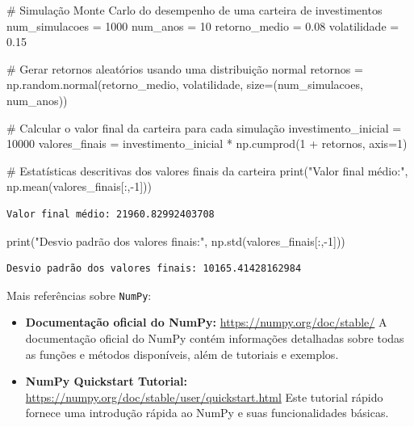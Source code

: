 \documentclass[
  portuguese,
  letterpaper,
  DIV=11,
  numbers=noendperiod]{scrreprt}
\newenvironment{Shaded}{\begin{snugshade}}{\end{snugshade}}
\newcommand{\BuiltInTok}[1]{\textcolor[rgb]{0.00,0.23,0.31}{#1}}
\newcommand{\CommentTok}[1]{\textcolor[rgb]{0.37,0.37,0.37}{#1}}
\newcommand{\DecValTok}[1]{\textcolor[rgb]{0.68,0.00,0.00}{#1}}
\newcommand{\FloatTok}[1]{\textcolor[rgb]{0.68,0.00,0.00}{#1}}
\newcommand{\NormalTok}[1]{\textcolor[rgb]{0.00,0.23,0.31}{#1}}
\newcommand{\OperatorTok}[1]{\textcolor[rgb]{0.37,0.37,0.37}{#1}}
\newcommand{\StringTok}[1]{\textcolor[rgb]{0.13,0.47,0.30}{#1}}
\theoremstyle{definition}
\theoremstyle{remark}
\begin{document}
\begin{Shaded}
\begin{Highlighting}[]
\CommentTok{\# Simulação Monte Carlo do desempenho de uma carteira de investimentos}
\NormalTok{num\_simulacoes }\OperatorTok{=} \DecValTok{1000}
\NormalTok{num\_anos }\OperatorTok{=} \DecValTok{10}
\NormalTok{retorno\_medio }\OperatorTok{=} \FloatTok{0.08}
\NormalTok{volatilidade }\OperatorTok{=} \FloatTok{0.15}

\CommentTok{\# Gerar retornos aleatórios usando uma distribuição normal}
\NormalTok{retornos }\OperatorTok{=}\NormalTok{ np.random.normal(retorno\_medio, volatilidade, size}\OperatorTok{=}\NormalTok{(num\_simulacoes, num\_anos))}

\CommentTok{\# Calcular o valor final da carteira para cada simulação}
\NormalTok{investimento\_inicial }\OperatorTok{=} \DecValTok{10000}
\NormalTok{valores\_finais }\OperatorTok{=}\NormalTok{ investimento\_inicial }\OperatorTok{*}\NormalTok{ np.cumprod(}\DecValTok{1} \OperatorTok{+}\NormalTok{ retornos, axis}\OperatorTok{=}\DecValTok{1}\NormalTok{)}

\CommentTok{\# Estatísticas descritivas dos valores finais da carteira}
\BuiltInTok{print}\NormalTok{(}\StringTok{"Valor final médio:"}\NormalTok{, np.mean(valores\_finais[:,}\OperatorTok{{-}}\DecValTok{1}\NormalTok{]))}
\end{Highlighting}
\end{Shaded}

\begin{verbatim}
Valor final médio: 21960.82992403708
\end{verbatim}

\begin{Shaded}
\begin{Highlighting}[]
\BuiltInTok{print}\NormalTok{(}\StringTok{"Desvio padrão dos valores finais:"}\NormalTok{, np.std(valores\_finais[:,}\OperatorTok{{-}}\DecValTok{1}\NormalTok{]))}
\end{Highlighting}
\end{Shaded}

\begin{verbatim}
Desvio padrão dos valores finais: 10165.41428162984
\end{verbatim}

Mais referências sobre \texttt{NumPy}:

\begin{itemize}
\item
  \textbf{Documentação oficial do NumPy:}
  \url{https://numpy.org/doc/stable/} A documentação oficial do NumPy
  contém informações detalhadas sobre todas as funções e métodos
  disponíveis, além de tutoriais e exemplos.
\item
  \textbf{NumPy Quickstart Tutorial:}
  \url{https://numpy.org/doc/stable/user/quickstart.html} Este tutorial
  rápido fornece uma introdução rápida ao NumPy e suas funcionalidades
  básicas.
\end{itemize}
\end{document}
